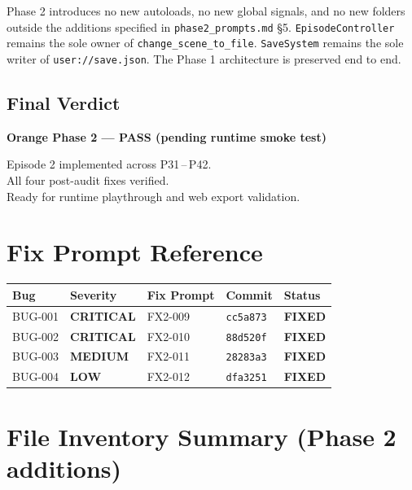 \documentclass[12pt, a4paper]{article}
\newcommand{\sevCrit}{\textcolor{critred}{\textbf{CRITICAL}}}
\newcommand{\sevMed}{\textcolor{medyell}{\textbf{MEDIUM}}}
\newcommand{\sevLow}{\textcolor{lowblue}{\textbf{LOW}}}
\newcommand{\sevFixed}{\textcolor{passgre}{\textbf{FIXED}}}
\begin{document}
Phase 2 introduces no new autoloads, no new global signals, and no new
folders outside the additions specified in \texttt{phase2\_prompts.md} \S5.
\texttt{EpisodeController} remains the sole owner of
\texttt{change\_scene\_to\_file}. \texttt{SaveSystem} remains the sole writer
of \texttt{user://save.json}. The Phase 1 architecture is preserved end to end.

\subsection{Final Verdict}

\begin{center}
  \large\bfseries\color{passgre}
  Orange Phase 2 --- PASS (pending runtime smoke test)
\end{center}

\begin{center}
  \normalsize Episode 2 implemented across P31\,--\,P42.\\
  All four post-audit fixes verified.\\
  Ready for runtime playthrough and web export validation.
\end{center}

\appendix
\section{Fix Prompt Reference}

\begin{center}
\begin{tabular}{lllll}
\toprule
\textbf{Bug} & \textbf{Severity} & \textbf{Fix Prompt} & \textbf{Commit} & \textbf{Status} \\
\midrule
BUG-001 & \sevCrit & FX2-009 & \texttt{cc5a873} & \sevFixed \\
BUG-002 & \sevCrit & FX2-010 & \texttt{88d520f} & \sevFixed \\
BUG-003 & \sevMed  & FX2-011 & \texttt{28283a3} & \sevFixed \\
BUG-004 & \sevLow  & FX2-012 & \texttt{dfa3251} & \sevFixed \\
\bottomrule
\end{tabular}
\end{center}

\section{File Inventory Summary (Phase 2 additions)}
\end{document}
